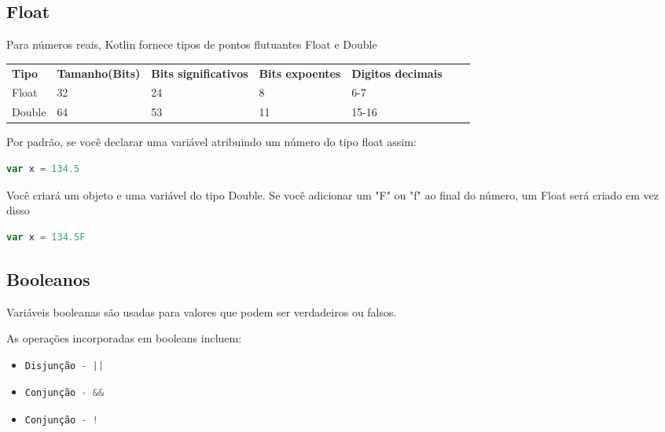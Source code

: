    \subsection{Float}
    Para números reais, Kotlin fornece tipos de pontos flutuantes Float e Double
    
    \begin{tabular}{p{1cm} p{2.5cm} p{3.0cm} p{3.0cm} p{3.5cm} cp{2cm}}
      
      \textbf{Tipo} \centering & \textbf{Tamanho(Bits)} & \textbf{Bits significativos} & \textbf{Bits expoentes} & \textbf{Digitos decimais} \\ 
          Float \centering     & 32  \centering         &  24    & 8              & 6-7 \\
          Double \centering    & 64  \centering         &  53  & 11       &15-16  \\
      \end{tabular}
      Por padrão, se você declarar uma variável 
      atribuindo um número do tipo float assim:
      \begin{lstlisting}[label={lst:example1}, language=Kotlin]
      var x = 134.5 
      \end{lstlisting}
      Você criará um objeto e uma variável do tipo Double.
      Se você adicionar um "F" ou "f" ao final do número, 
      um Float será criado em vez disso
      \begin{lstlisting}[label={lst:example1}, language=Kotlin]
      var x = 134.5F 
      \end{lstlisting}
   
      \subsection{Booleanos}
      Variáveis booleanas são usadas para valores que podem 
      ser verdadeiros ou falsos. 

      As operações incorporadas em booleans incluem:
      \begin{itemize}
      \item
      \begin{lstlisting}[label={lst:example1}, language=Kotlin]
Disjunção - ||
      \end{lstlisting}

      \item
      \begin{lstlisting}[label={lst:example1}, language=Kotlin]
Conjunção - &&
      \end{lstlisting}

      \item
      \begin{lstlisting}[label={lst:example1}, language=Kotlin]
Conjunção - !
      \end{lstlisting}
      \end{itemize}
      
